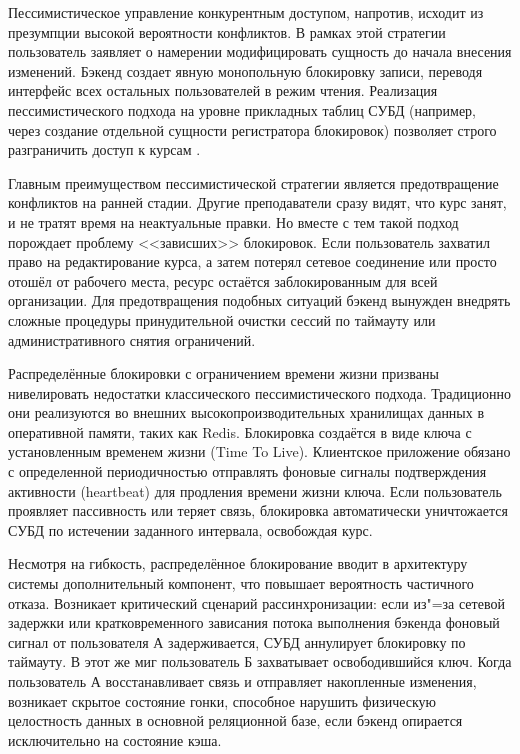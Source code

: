 \documentclass[coursework]{SCWorks}
\begin{document}
Пессимистическое управление конкурентным доступом, напротив, исходит из презумпции высокой вероятности конфликтов. В рамках этой стратегии пользователь заявляет о намерении модифицировать сущность до начала внесения изменений. Бэкенд создает явную монопольную блокировку записи, переводя интерфейс всех остальных пользователей в режим чтения. Реализация пессимистического подхода на уровне прикладных таблиц СУБД (например, через создание отдельной сущности регистратора блокировок) позволяет строго разграничить доступ к курсам \cite{fowler}.

Главным преимуществом пессимистической стратегии является предотвращение конфликтов на ранней стадии. Другие преподаватели сразу видят, что курс занят, и не тратят время на неактуальные правки. Но вместе с тем такой подход порождает проблему <<зависших>> блокировок. Если пользователь захватил право на редактирование курса, а затем потерял сетевое соединение или просто отошёл от рабочего места, ресурс остаётся заблокированным для всей организации. Для предотвращения подобных ситуаций бэкенд вынужден внедрять сложные процедуры принудительной очистки сессий по таймауту или административного снятия ограничений.

Распределённые блокировки с ограничением времени жизни призваны нивелировать недостатки классического пессимистического подхода. Традиционно они реализуются во внешних высокопроизводительных хранилищах данных в оперативной памяти, таких как Redis. Блокировка создаётся в виде ключа с установленным временем жизни (Time To Live). Клиентское приложение обязано с определенной периодичностью отправлять фоновые сигналы подтверждения активности (heartbeat) для продления времени жизни ключа. Если пользователь проявляет пассивность или теряет связь, блокировка автоматически уничтожается СУБД по истечении заданного интервала, освобождая курс.

Несмотря на гибкость, распределённое блокирование вводит в архитектуру системы дополнительный компонент, что повышает вероятность частичного отказа. Возникает критический сценарий рассинхронизации: если из"=за сетевой задержки или кратковременного зависания потока выполнения бэкенда фоновый сигнал от пользователя А задерживается, СУБД аннулирует блокировку по таймауту. В этот же миг пользователь Б захватывает освободившийся ключ. Когда пользователь А восстанавливает связь и отправляет накопленные изменения, возникает скрытое состояние гонки, способное нарушить физическую целостность данных в основной реляционной базе, если бэкенд опирается исключительно на состояние кэша.
\end{document}
